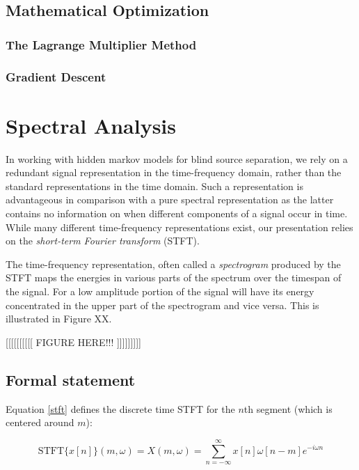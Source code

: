 \documentclass[11pt, oneside, a4paper]{report}
\begin{document}
\subsection{Mathematical Optimization}\label{optimization}

\subsubsection{The Lagrange Multiplier Method}

\subsubsection{Gradient Descent}


\section{Spectral Analysis}

In working with hidden markov models for blind source separation, we
rely on a redundant signal representation in the time-frequency
domain, rather than the standard representations in the time
domain. Such a representation is advantageous in comparison with a
pure spectral representation as the latter contains no information on
when different components of a signal occur in time. While many
different time-frequency representations exist, our presentation
relies on the \emph{short-term Fourier transform} (STFT).

The time-frequency representation, often called a \emph{spectrogram} produced by the STFT maps the
energies in various parts of the spectrum over the timespan of the
signal. For a low amplitude portion of the signal will have its energy
concentrated in the upper part of the spectrogram and vice versa. This
is illustrated in Figure XX.

[[[[[[[[[[ FIGURE HERE!!! ]]]]]]]]]

\subsection{Formal statement}

Equation \ref{stft} defines the discrete time STFT for the $n$th
segment (which is centered around $m$):

\begin{equation}\label{stft}
  \text{STFT}\{x[n]\}(m,\omega)= X(m,\omega) =\sum_{n = -\infty}^{\infty}
  x[n]\omega[n-m]e^{-i\omega n}
\end{equation}
\end{document}
